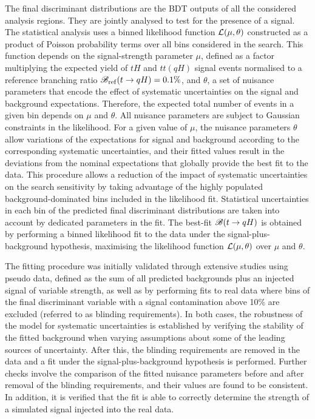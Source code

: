 \documentclass[PAPER, coverpage, atlasdraft=true, texlive=2016, UKenglish]{\ATLASLATEXPATH atlasdoc}
\begin{document}
The final discriminant distributions are the BDT outputs of all the considered analysis regions. They are jointly analysed to test for the 
presence of a signal. The statistical analysis uses a binned likelihood function ${\cal L}(\mu,\theta)$ constructed as
a product of Poisson probability terms over all bins considered in the search. This function depends
on the signal-strength parameter $\mu$, defined as a factor multiplying the expected yield of $tH$ and $tt(qH)$ signal events
normalised to a reference branching ratio $\mathscr{B}_{\mathrm{ref}}(t\to qH)=0.1\%$,
and $\theta$, a set of nuisance parameters that encode the effect of systematic uncertainties on the signal and background expectations. 
Therefore, the expected total number of events in a given bin depends on $\mu$ and $\theta$. 
All nuisance parameters are subject to Gaussian constraints in the likelihood.
For a given value of $\mu$, the nuisance parameters $\theta$ allow variations of the expectations for signal and background
according to the corresponding systematic uncertainties, and their fitted values result in the deviations from
the nominal expectations that globally provide the best fit to the data.
This procedure allows a reduction of the impact of systematic uncertainties on 
the search sensitivity by taking advantage of the highly populated background-dominated bins included in the likelihood fit.
Statistical uncertainties in each bin of the predicted final discriminant distributions are taken into account by dedicated parameters in the fit.     
The best-fit $\mathscr{B}(t\to qH)$ is obtained by performing a binned likelihood fit to the data under the signal-plus-background
hypothesis, maximising the likelihood function ${\cal L}(\mu,\theta)$ over $\mu$ and $\theta$.

The fitting procedure was initially validated through extensive studies using pseudo data, defined as the sum of all predicted backgrounds 
plus an injected signal of variable strength, as well as by performing fits to real data where bins of the final discriminant variable with 
a signal contamination above 10\% are excluded (referred to as blinding requirements).
In both cases, the robustness of the model for systematic uncertainties is established by verifying the stability of the fitted background 
when varying assumptions about some of the leading sources of uncertainty. 
After this, the blinding requirements
are removed in the data and a fit under the signal-plus-background hypothesis is performed. Further checks involve the comparison of the fitted 
nuisance parameters before and after removal of the blinding requirements, and their values are found to be consistent. In addition, it is verified that the 
fit is able to correctly determine the strength of a simulated signal injected into the real data.
\end{document}
